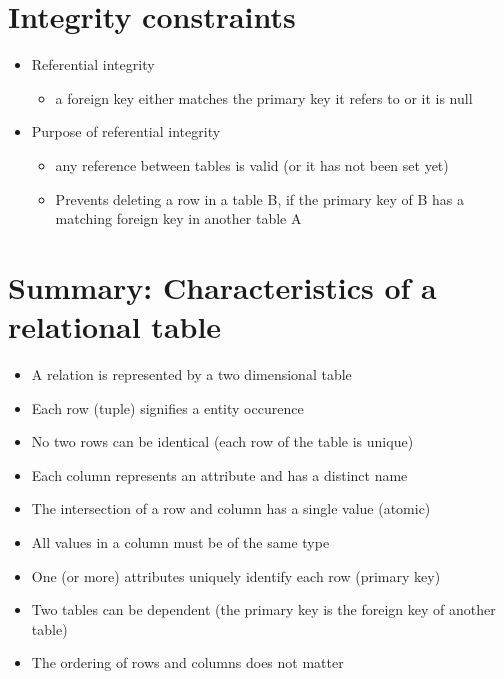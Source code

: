 \documentclass{article}[18pt]
\begin{document}
\section{Integrity constraints}
\begin{itemize}
\item Referential integrity
\begin{itemize}
\item a foreign key either matches the primary key it refers to or it is null
\end{itemize}
\item Purpose of referential integrity
\begin{itemize}
\item any reference between tables is valid (or it has not been set yet)
\item Prevents deleting a row in a table B, if the primary key of B has a matching foreign key in another table A
\end{itemize}
\end{itemize}
\section{Summary: Characteristics of a relational table}
\begin{itemize}
\item A relation is represented by a two dimensional table
\item Each row (tuple) signifies a entity occurence
\item No two rows can be identical (each row of the table is unique)
\item Each column represents an attribute and has a distinct name
\item The intersection of a row and column has a single value (atomic)
\item All values in a column must be of the same type
\item One (or more) attributes uniquely identify each row (primary key)
\item Two tables can be dependent (the primary key is the foreign key of another table)
\item The ordering of rows and columns does not matter
\end{itemize}
\end{document}
